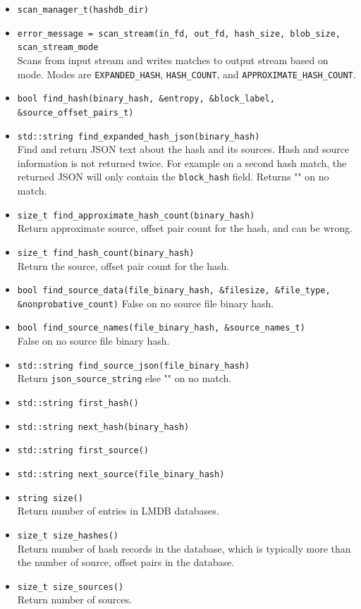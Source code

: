 \documentclass[11pt,fleqn]{article} %
\begin{document}
\begin{itemize}
\item \verb+scan_manager_t(hashdb_dir)+
\item \verb+error_message = scan_stream(in_fd, out_fd, hash_size, blob_size,+\\
\verb+scan_stream_mode+\\
Scans from input stream and writes matches to output stream based on mode.  Modes are \verb+EXPANDED_HASH+, \verb+HASH_COUNT+, and \verb+APPROXIMATE_HASH_COUNT+.
\item \verb+bool find_hash(binary_hash, &entropy, &block_label, &source_offset_pairs_t)+\\
\item \verb+std::string find_expanded_hash_json(binary_hash)+\\
Find and return JSON text about the hash and its sources. Hash and source information is not returned twice. For example on a second hash match, the returned JSON will only contain the \verb+block_hash+ field. Returns "" on no match.\\
\item \verb+size_t find_approximate_hash_count(binary_hash)+\\
Return approximate source, offset pair count for the hash, and can be wrong.
\item \verb+size_t find_hash_count(binary_hash)+\\
Return the source, offset pair count for the hash.
\item \verb+bool find_source_data(file_binary_hash, &filesize, &file_type,+\\
\verb+&nonprobative_count)+
False on no source file binary hash.
\item \verb+bool find_source_names(file_binary_hash, &source_names_t)+\\
False on no source file binary hash.
\item \verb+std::string find_source_json(file_binary_hash)+\\
Return \verb+json_source_string+ else "" on no match.
\item \verb+std::string first_hash()+
\item \verb+std::string next_hash(binary_hash)+
\item \verb+std::string first_source()+
\item \verb+std::string next_source(file_binary_hash)+
\item \verb+string size()+\\
Return number of entries in LMDB databases.
\item \verb+size_t size_hashes()+\\
Return number of hash records in the database, which is typically more than the number of source, offset pairs in the database.
\item \verb+size_t size_sources()+\\
Return number of sources.
\end{itemize}
\end{document}
